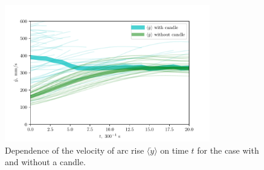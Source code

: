 \begin{figure}[htbp]
	\centering
	\includegraphics[width=0.8\textwidth]{figures/8)_candle_dot_y_a33.pdf}
	\caption{Dependence of the velocity of arc rise $\langle \dot{y}\rangle$ on time $t$ for the case with and without a candle.}
	\label{fig:label}
\end{figure}